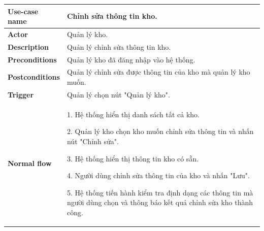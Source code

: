             \begin{longtable}{| p{} | p{} |} 
                \hline
                 \textbf{Use-case name} 
                & 
                Chỉnh sửa thông tin kho.
                \\
                \hline
                \textbf{Actor} 
                & 
                Quản lý kho.
                \\
                \hline
                \textbf{Description} 
                & 
                Quản lý chỉnh sửa thông tin kho.
                \\
                \hline
                 \textbf{Preconditions} 
                &
                Quản lý kho đã đăng nhập vào hệ thống.
                \\
                \hline
                \textbf{Postconditions} 
                & 
                Quản lý chỉnh sửa được thông tin của kho mà quản lý kho muốn.
                \\
                \hline
                \textbf{Trigger} 
                & 
                Quản lý chọn nút "Quản lý kho".
                \\
                \hline
                \begin{flushleft}
                 \textbf{Normal flow}
                \end{flushleft}
                & 
                1. Hệ thống hiển thị danh sách tất cả kho.
                    
                    2. Quản lý kho chọn kho muốn chỉnh sửa thông tin và nhấn nút "Chỉnh sửa".
                    
                    3. Hệ thống hiển thị thông tin kho có sẵn.
                    
                    4. Người dùng chỉnh sửa thông tin của kho và nhấn "Lưu".
                    
                    5. Hệ thống tiến hành kiểm tra định dạng các thông tin mà người dùng chọn và thông báo kết quả chỉnh sửa kho thành công.
                    

\end{longtable}
